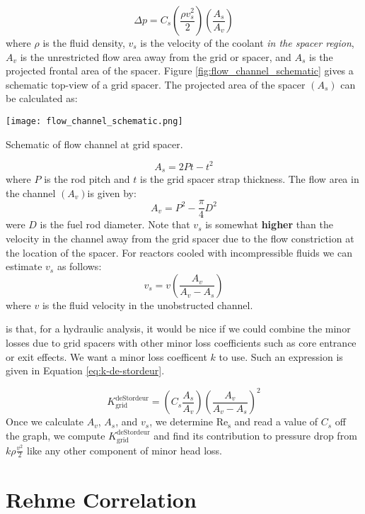 \begin{equation}
\Delta p = C_s\left(\frac{\rho v_s^2}{2} \right)\left(\frac{A_s}{A_v} \right)
\label{eq:de-stordeur}
\end{equation}
where $\rho$ is the fluid density, $v_s$ is the velocity of the coolant \emph{in the spacer region}, $A_v$ is the unrestricted flow area away from the grid or spacer, and $A_s$ is the projected frontal area of the spacer.  Figure \ref{fig:flow_channel_schematic} gives a schematic top-view of a grid spacer.  The projected area of the spacer $(A_s)$ can be calculated as:
\begin{marginfigure}
\texttt{[image: flow\_channel\_schematic.png]}
\caption{Schematic of flow channel at grid spacer.}
\label{fig:flow_channel_schematic}
\end{marginfigure}
$$A_s = 2Pt - t^2$$
where $P$ is the rod pitch and $t$ is the grid spacer strap thickness.  The flow area in the channel $(A_v)$is given by:
$$A_v = P^2 - \frac{\pi}{4} D^2$$
were $D$ is the fuel rod diameter.  Note that $v_s$ is somewhat \textbf{higher} than the velocity in the channel away from the grid spacer due to the flow constriction at the location of the spacer.  For reactors cooled with incompressible fluids we can estimate $v_s$ as follows:
$$v_s = v \left(\frac{A_v}{A_v - A_s} \right)$$
where $v$ is the fluid velocity in the unobstructed channel.

 is that, for a hydraulic analysis, it would be nice if we could combine the minor losses due to grid spacers with other minor loss coefficients such as core entrance or exit effects.  We want a minor loss coefficent $k$ to use.  Such an expression is given in Equation \ref{eq:k-de-stordeur}.  

\begin{equation}
K_{\text{grid}}^{\text{deStordeur}} = \left(C_s \frac{A_s}{A_{v}} \right)\left(\frac{A_v}{A_v - A_s} \right)^2
\label{eq:k-de-stordeur}
\end{equation} 
Once we calculate $A_v$, $A_s$, and $v_s$, we determine $\text{Re}_{\text{s}}$ and read a value of $C_s$ off the graph, we compute $K_{\text{grid}}^{\text{deStordeur}}$ and find its contribution to pressure drop from $k\rho \frac{v^2}{2}$ like any other component of minor head loss.

\section{Rehme Correlation} 

